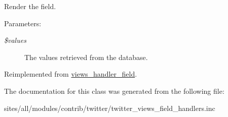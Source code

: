Render the field.

\begin{Desc}
\item[Parameters:]
\begin{description}
\item[{\em \$values}]The values retrieved from the database. \end{description}
\end{Desc}


Reimplemented from \hyperlink{classviews__handler__field_82ff951c5e9ceb97b2eab86f880cbc1e}{views\_\-handler\_\-field}.

The documentation for this class was generated from the following file:\begin{CompactItemize}
\item 
sites/all/modules/contrib/twitter/twitter\_\-views\_\-field\_\-handlers.inc\end{CompactItemize}
